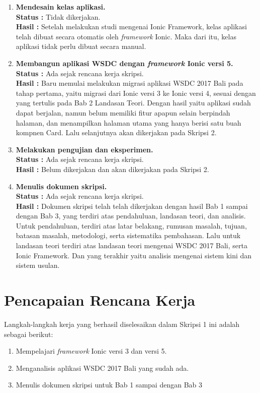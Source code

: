 \documentclass[a4paper,twoside]{article}
\begin{document}
\begin{enumerate}
		\item \textbf{Mendesain kelas aplikasi.}\\
		{\bf Status :} Tidak dikerjakan.\\
		{\bf Hasil :} Setelah melakukan studi mengenai Ionic Framework, kelas aplikasi telah dibuat secara otomatis oleh \textit{framework} Ionic. Maka dari itu, kelas aplikasi tidak perlu dibuat secara manual.
		
		\item \textbf{Membangun aplikasi WSDC dengan \textit{framework} Ionic versi 5.}\\
		{\bf Status :} Ada sejak rencana kerja skripsi.\\
		{\bf Hasil :} Baru memulai melakukan migrasi aplikasi WSDC 2017 Bali pada tahap pertama, yaitu migrasi dari Ionic versi 3 ke Ionic versi 4, sesuai dengan yang tertulis pada Bab 2 Landasan Teori. Dengan hasil yaitu aplikasi sudah dapat berjalan, namun belum memiliki fitur apapun selain berpindah halaman, dan menampilkan halaman utama yang hanya berisi satu buah kompnen Card. Lalu selanjutnya akan dikerjakan pada Skripsi 2.
		
		\item \textbf{Melakukan pengujian dan eksperimen.}\\
		{\bf Status :} Ada sejak rencana kerja skripsi.\\
		{\bf Hasil :} Belum dikerjakan dan akan dikerjakan pada Skripsi 2.
		
		\item \textbf{Menulis dokumen skripsi.}\\
		{\bf Status :} Ada sejak rencana kerja skripsi.\\
		{\bf Hasil :} Dokumen skripsi telah telah dikerjakan dengan hasil Bab 1 sampai dengan Bab 3, yang terdiri atas pendahuluan, landasan teori, dan analisis. Untuk pendahuluan, terdiri atas latar belakang, rumusan masalah, tujuan, batasan masalah, metodologi, serta sistematika pembahasan. Lalu untuk landasan teori terdiri atas landasan teori mengenai WSDC 2017 Bali, serta Ionic Framework. Dan yang terakhir yaitu analisis mengenai sistem kini dan sistem usulan.

	\end{enumerate}

\section{Pencapaian Rencana Kerja}
Langkah-langkah kerja yang berhasil diselesaikan dalam Skripsi 1 ini adalah sebagai berikut:
\begin{enumerate}
\item Mempelajari \textit{framework} Ionic versi 3 dan versi 5.
\item Menganalisis aplikasi WSDC 2017 Bali yang sudah ada.
\item Menulis dokumen skripsi untuk Bab 1 sampai dengan Bab 3
\end{enumerate}
\end{document}
